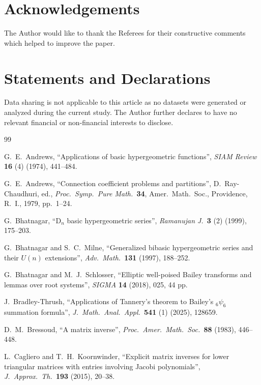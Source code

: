 \documentclass[reqno,12pt]{amsart}
\theoremstyle{remark}
\numberwithin{equation}{section}
\begin{document}
\section*{Acknowledgements}
The Author would like to thank the Referees for their
constructive comments which helped to improve the paper.

\section*{Statements and Declarations}
Data sharing is not applicable to this article as no datasets were
generated or analyzed during the current study.
The Author further declares to have no relevant financial
or non-financial interests to disclose.

\begin{thebibliography}{99}


 G.~E.~Andrews,
``Applications of basic hypergeometric functions'',
{\em SIAM Review} \textbf{16} (4) (1974), 441--484.

 G.~E.~Andrews,
  ``Connection coefficient problems and partitions'',
  D.~Ray-Chaudhuri, ed.,
  {\em Proc.\ Symp.\ Pure Math.\ }\textbf{34},
  Amer.\ Math.\ Soc., Providence, R.~I., 1979, pp.~1--24.

 G.\ Bhatnagar,
``$\mathrm D_n$ basic hypergeometric series'',
\textit{Ramanujan J.\ }\textbf{3} (2) (1999), 175--203.

 G.~Bhatnagar and S.~C.~Milne,
  ``Generalized bibasic hypergeometric series and their $U(n)$ extensions'',
{\em Adv.\ Math.\ }\textbf{131} (1997), 188--252.

 G.\ Bhatnagar and M.\ J.\ Schlosser,
``Elliptic well-poised {B}ailey transforms and lemmas over root systems'',
{\em SIGMA} \textbf{14} (2018), 025, 44 pp.

 J.\ Bradley-Thrush,
``Applications of {T}annery's theorem to {B}ailey's $_6\psi_6$
summation formula'',
{\em J.\ Math.\ Anal.\ Appl.\ }\textbf{541} (1) (2025), 128659.

 D.~M.~Bressoud,
  ``A matrix inverse'',
{\em Proc.\ Amer.\ Math.\ Soc.\ }\textbf{88} (1983), 446--448. 

 L.\ Cagliero and T.\ H.\ Koornwinder,
``Explicit matrix inverses for lower triangular matrices
with entries involving {J}acobi polynomials'',
{\em J.\ Approx.\ Th.\ }\textbf{193} (2015), 20--38.


\end{thebibliography}
\end{document}
